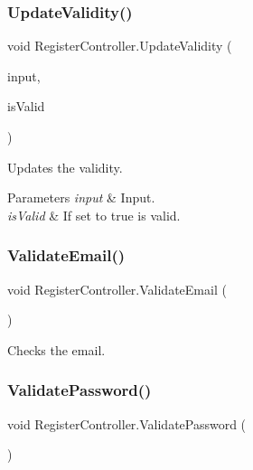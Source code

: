 \subsubsection{\texorpdfstring{Update\+Validity()}{UpdateValidity()}}
{\footnotesize\ttfamily void Register\+Controller.\+Update\+Validity (\begin{DoxyParamCaption}\item[{Input\+Field}]{input,  }\item[{bool}]{is\+Valid }\end{DoxyParamCaption})\hspace{0.3cm}{\ttfamily [inline]}}



Updates the validity. 


\begin{DoxyParams}{Parameters}
{\em input} & Input.\\
\hline
{\em is\+Valid} & If set to {\ttfamily true} is valid.\\
\hline
\end{DoxyParams}
\mbox{\label{classRegisterController_af4daa10f24e177e3dc114128ef2aedbe}} 
\subsubsection{\texorpdfstring{Validate\+Email()}{ValidateEmail()}}
{\footnotesize\ttfamily void Register\+Controller.\+Validate\+Email (\begin{DoxyParamCaption}{ }\end{DoxyParamCaption})\hspace{0.3cm}{\ttfamily [inline]}}



Checks the email. 

\mbox{\label{classRegisterController_a6ec9cefdd115c96a4619df4b4154b10b}} 
\subsubsection{\texorpdfstring{Validate\+Password()}{ValidatePassword()}}
{\footnotesize\ttfamily void Register\+Controller.\+Validate\+Password (\begin{DoxyParamCaption}{ }\end{DoxyParamCaption})\hspace{0.3cm}{\ttfamily [inline]}}



